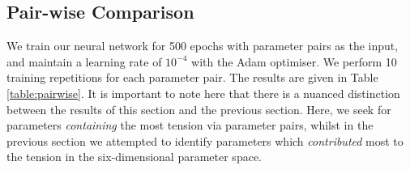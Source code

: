 \documentclass[%
 reprint,
 amsmath,amssymb,
 aps,
]{revtex4-2}
\begin{document}
\subsection{Pair-wise Comparison} \label{section:pair}

We train our neural network for 500 epochs with parameter pairs as the input, and maintain a learning rate of $10^{-4}$ with the Adam optimiser. We perform 10 training repetitions for each parameter pair. The results are given in Table \ref{table:pairwise}. It is important to note here that there is a nuanced distinction between the results of this section and the previous section. Here, we seek for parameters \textit{containing} the most tension via parameter pairs, whilst in the previous section we attempted to identify parameters which \textit{contributed} most to the tension in the six-dimensional parameter space.
\end{document}
